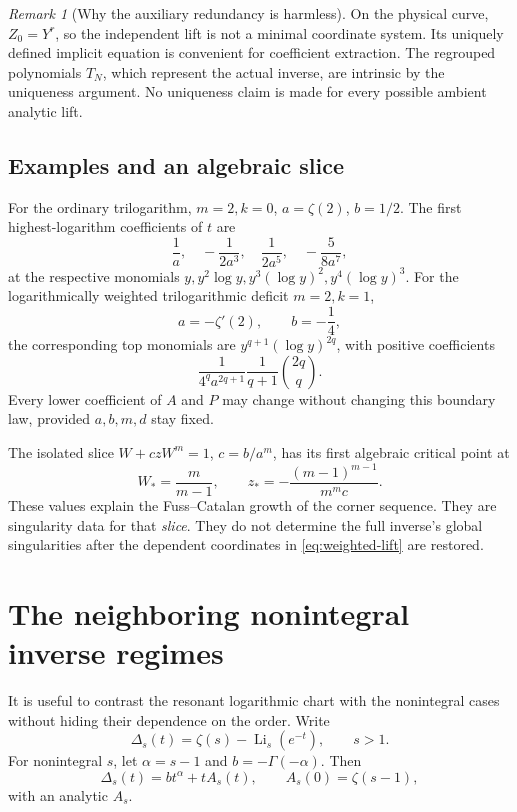 \documentclass[11pt,a4paper]{article}
\numberwithin{equation}{section}
\theoremstyle{definition}
\theoremstyle{remark}
\newtheorem{remark}[theorem]{Remark}
\DeclareMathOperator{\Li}{Li}
\begin{document}
\begin{remark}[Why the auxiliary redundancy is harmless]
On the physical curve, \(Z_0=Y^r\), so the independent lift is not a
minimal coordinate system.  Its uniquely defined implicit equation is
convenient for coefficient extraction.  The regrouped polynomials
\(T_N\), which represent the actual inverse, are intrinsic by the
uniqueness argument.  No uniqueness claim is made for every possible
ambient analytic lift.
\end{remark}

\subsection{Examples and an algebraic slice}

For the ordinary trilogarithm, \(m=2,k=0\), \(a=\zeta(2)\), \(b=1/2\).
The first highest-logarithm coefficients of \(t\) are
\[
 \frac1a,\quad
 -\frac{1}{2a^3},\quad
 \frac{1}{2a^5},\quad
 -\frac{5}{8a^7},
\]
at the respective monomials
\(y,y^2\log y,y^3(\log y)^2,y^4(\log y)^3\).
For the logarithmically weighted trilogarithmic deficit \(m=2,k=1\),
\[
 a=-\zeta'(2),\qquad b=-\frac14,
\]
the corresponding top monomials are
\(y^{q+1}(\log y)^{2q}\), with positive coefficients
\[
 \frac{1}{4^q a^{2q+1}}\frac1{q+1}\binom{2q}{q}.
\]
Every lower coefficient of \(A\) and \(P\) may change without changing
this boundary law, provided \(a,b,m,d\) stay fixed.

The isolated slice \(W+czW^m=1\), \(c=b/a^m\), has its first algebraic
critical point at
\[
 W_*=\frac{m}{m-1},\qquad
 z_*=-\frac{(m-1)^{m-1}}{m^m c}.
\]
These values explain the Fuss--Catalan growth of the corner sequence.
They are singularity data for that \emph{slice}.  They do not determine
the full inverse's global singularities after the dependent coordinates
in \eqref{eq:weighted-lift} are restored.

\section{The neighboring nonintegral inverse regimes}
\label{sec:noninteger}

It is useful to contrast the resonant logarithmic chart with the
nonintegral cases without hiding their dependence on the order.
Write
\[
 \Delta_s(t)=\zeta(s)-\Li_s(e^{-t}),\qquad s>1.
\]
For nonintegral \(s\), let \(\alpha=s-1\) and
\(b=-\Gamma(-\alpha)\).  Then
\begin{equation}
 \Delta_s(t)=b t^\alpha+tA_s(t),\qquad
 A_s(0)=\zeta(s-1),
 \label{eq:nonintegral-normal}
\end{equation}
with an analytic \(A_s\).
\end{document}

